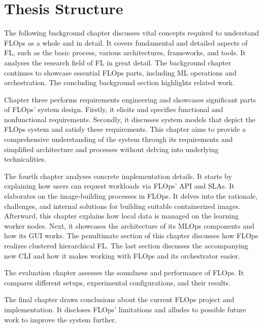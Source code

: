 \section{Thesis Structure}

The following background chapter discusses vital concepts required to understand FLOps as a whole and in detail.
It covers fundamental and detailed aspects of FL, such as the basic process, various architectures, frameworks, and tools.
It analyses the research field of FL in great detail.
The background chapter continues to showcase essential FLOps parts, including ML operations and orchestration.
The concluding background section highlights related work.

Chapter three performs requirements engineering and showcases significant parts of FLOps' system design.
Firstly, it elicits and specifies functional and nonfunctional requirements.
Secondly, it discusses system models that depict the FLOps system and satisfy these requirements.
This chapter aims to provide a comprehensive understanding of the system through its requirements and simplified architecture and processes without delving into underlying technicalities.

The fourth chapter analyses concrete implementation details.
It starts by explaining how users can request workloads via FLOps' API and SLAs.
It elaborates on the image-building processes in FLOps.
It delves into the rationale, challenges, and internal solutions for building suitable containerized images.
Afterward, this chapter explains how local data is managed on the learning worker nodes.
Next, it showcases the architecture of its MLOps components and how its GUI works.
The penultimate section of this chapter discusses how FLOps realizes clustered hierarchical FL.
The last section discusses the accompanying new CLI and how it makes working with FLOps and its orchestrator easier.

The evaluation chapter assesses the soundness and performance of FLOps.
It compares different setups, experimental configurations, and their results.

The final chapter draws conclusions about the current FLOps project and implementation.
It discloses FLOps' limitations and alludes to possible future work to improve the system further.

